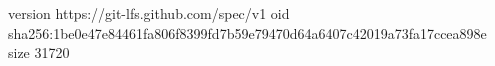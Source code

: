 version https://git-lfs.github.com/spec/v1
oid sha256:1be0e47e84461fa806f8399fd7b59e79470d64a6407c42019a73fa17ccea898e
size 31720
